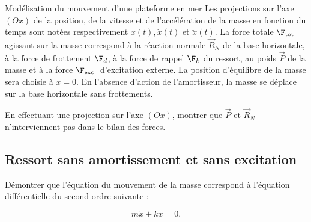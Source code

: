 \begin{exo}[PC][1][devoir]{Modélisation du mouvement d'une plateforme en mer}
  Les projections sur l'axe $(Ox)$ de la position, de la vitesse et de l'accélération de la masse en fonction du temps sont notées respectivement $x(t), \dot{x}(t)$ et $\ddot{x}(t)$. La force totale $\F_{\text {tot }}$ agissant sur la masse correspond à la réaction normale $\Vec{R}_{N}$ de la base horizontale, à la force de frottement $\F_{d}$, à la force de rappel $\F_{k}$ du ressort, au poids $\Vec{P}$ de la masse et à la force $\F_{\text {exc }}$ d'excitation externe. La position d'équilibre de la masse sera choisie à $x=0$. En l'absence d'action de l'amortisseur, la masse se déplace sur la base horizontale sans frottements.

   \begin{quest}
  \item En effectuant une projection sur l'axe $(Ox)$, montrer que $\Vec{P}$ et $\Vec{R}_{N}$ n'interviennent pas dans le bilan des forces.

\end{quest}



  \subsection{Ressort sans amortissement et sans excitation}
\begin{quest}
  \item Démontrer que l'équation du mouvement de la masse correspond à l'équation différentielle du second ordre suivante :

  \begin{equation}
    m \ddot{x}+k x=0 .
  \end{equation}


\end{quest}
\end{exo}
